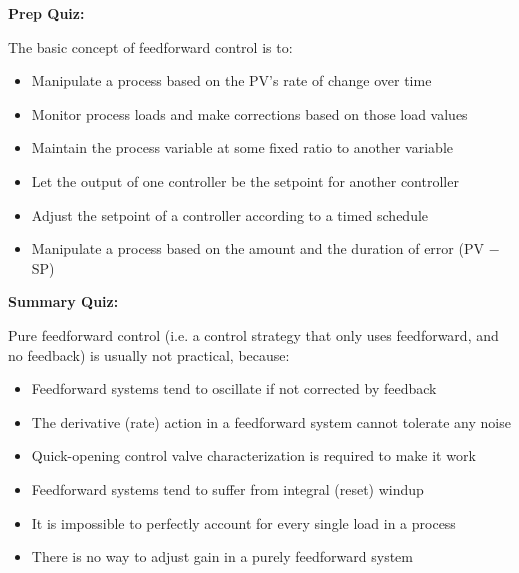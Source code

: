 \vfil \eject

\noindent
{\bf Prep Quiz:}

The basic concept of feedforward control is to:

\begin{itemize}
\item{} Manipulate a process based on the PV's rate of change over time
\vskip 5pt 
\item{} Monitor process loads and make corrections based on those load values
\vskip 5pt 
\item{} Maintain the process variable at some fixed ratio to another variable
\vskip 5pt 
\item{} Let the output of one controller be the setpoint for another controller
\vskip 5pt 
\item{} Adjust the setpoint of a controller according to a timed schedule
\vskip 5pt 
\item{} Manipulate a process based on the amount and the duration of error (PV $-$ SP)
\end{itemize}







\vfil \eject

\noindent
{\bf Summary Quiz:}

Pure feedforward control (i.e. a control strategy that only uses feedforward, and no feedback) is usually not practical, because:

\begin{itemize}
\item{} Feedforward systems tend to oscillate if not corrected by feedback
\vskip 5pt 
\item{} The derivative (rate) action in a feedforward system cannot tolerate any noise
\vskip 5pt 
\item{} Quick-opening control valve characterization is required to make it work
\vskip 5pt 
\item{} Feedforward systems tend to suffer from integral (reset) windup
\vskip 5pt 
\item{} It is impossible to perfectly account for every single load in a process
\vskip 5pt 
\item{} There is no way to adjust gain in a purely feedforward system
\end{itemize}






